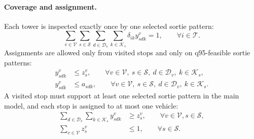 \paragraph{Coverage and assignment.}
Each tower is inspected exactly once by one selected sortie pattern:
\begin{equation}
\sum_{v\in\mathcal{V}}\sum_{s\in\mathcal{S}}\sum_{d\in\mathcal{D}_v}
\sum_{k\in\mathcal{K}_s}\delta_{ik}y^v_{sdk}=1,
\qquad \forall i\in\mathcal{T}.
\label{eq:sb-coverage}
\end{equation}
Assignments are allowed only from visited stops and only on q95-feasible sortie patterns:
\begin{align}
y^v_{sdk} &\leq z^v_s,
\qquad \forall v\in\mathcal{V},\ s\in\mathcal{S},\ d\in\mathcal{D}_v,\ k\in\mathcal{K}_s,
\label{eq:sb-stop-activation}\\
y^v_{sdk} &\leq a_{sdk},
\qquad \forall v\in\mathcal{V},\ s\in\mathcal{S},\ d\in\mathcal{D}_v,\ k\in\mathcal{K}_s.
\label{eq:sb-energy-activation}
\end{align}
A visited stop must support at least one selected sortie pattern in the main model, and each stop is assigned to at most one vehicle:
\begin{align}
\sum_{d\in\mathcal{D}_v}\sum_{k\in\mathcal{K}_s}y^v_{sdk}
&\geq z^v_s,
\qquad \forall v\in\mathcal{V},s\in\mathcal{S},
\label{eq:sb-visited-stop-use}\\
\sum_{v\in\mathcal{V}} z^v_s
&\leq 1,
\qquad \forall s\in\mathcal{S}.
\label{eq:sb-one-vehicle-per-stop}
\end{align}

